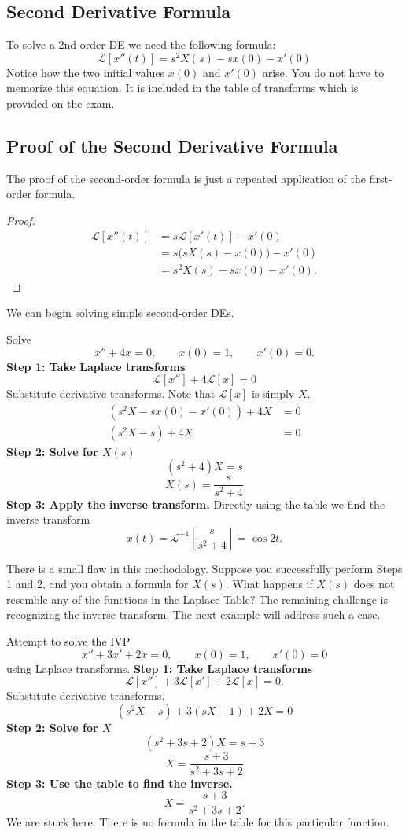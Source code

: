 \documentclass[10pt,letterpaper]{article}
\begin{document}
\subsection{Second Derivative Formula}
To solve a 2nd order DE we need the following formula:
\[
\boxed{\mathcal{L}[x''(t)]=s^2X(s)-sx(0)-x'(0)}
\]
Notice how the two initial values $x(0)$ and $x'(0)$ arise. You do not have to memorize this equation. It is included in the table of transforms which is provided on the exam.

\subsection{Proof of the Second Derivative Formula}
The proof of the second-order formula is just a repeated application of the first-order formula.

\begin{proof}
\begin{align*}
\mathcal{L}[x''(t)]
&=s\mathcal{L}[x'(t)]-x'(0)\\
&=s\bigl(sX(s)-x(0)\bigr)-x'(0)\\
&=s^2X(s)-sx(0)-x'(0).
\end{align*}
\end{proof}
We can begin solving simple second-order DEs.

\begin{example}[3]{
Solve
\[
x''+4x=0, \qquad x(0)=1, \qquad x'(0)=0.
\]
}
\textbf{Step 1: Take Laplace transforms}
\[
\mathcal{L}[x'']+4\mathcal{L}[x]=0
\]
Substitute derivative transforms. Note that $\mathcal{L}[x]$ is simply $X$.  
\begin{align*}    
(s^2X-sx(0)-x'(0))+4X&=0\\
(s^2X-s)+4X&=0
\end{align*}
\textbf{Step 2: Solve for $X(s)$}
\[
(s^2+4)X=s
\]
\[
X(s)=\frac{s}{s^2+4}
\]
\textbf{Step 3: Apply the inverse transform.}
Directly using the table we find the inverse transform
$$
x(t) = \mathcal{L}^{-1}\left[\frac{s}{s^2+4}\right] = \cos 2t. 
$$
\end{example}

There is a small flaw in this methodology. Suppose you successfully perform Steps 1 and 2, and you obtain a formula for $X(s)$. What happens if $X(s)$ does not resemble any of the functions in the Laplace Table? The remaining challenge is recognizing the inverse transform. The next example will address such a case.

\begin{example}[4]{   
Attempt to solve the IVP
\[
x''+3x'+2x=0, \qquad x(0)=1, \qquad x'(0)=0
\]
using Laplace transforms.
}
\textbf{Step 1: Take Laplace transforms}
\[
\mathcal{L}[x'']+3\mathcal{L}[x']+2\mathcal{L}[x]=0.
\]
Substitute derivative transforms.
\[
(s^2X-s)+3(sX-1)+2X=0
\]
\textbf{Step 2: Solve for $X$}
\[
(s^2+3s+2)X=s+3
\]
\[
X=\frac{s+3}{s^2+3s+2}
\]
\textbf{Step 3: Use the table to find the inverse.}
\[
X=\frac{s+3}{s^2+3s+2}.
\]
We are stuck here. There is no formula in the table for this particular function.
\end{example}
\end{document}
